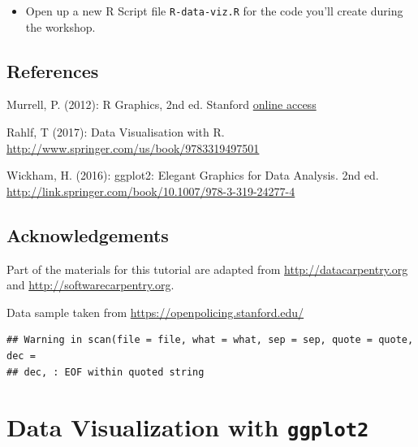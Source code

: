 \documentclass[]{book}
\providecommand{\tightlist}{%
  \setlength{\itemsep}{0pt}\setlength{\parskip}{0pt}}
\theoremstyle{definition}
\theoremstyle{definition}
\theoremstyle{definition}
\theoremstyle{remark}
\begin{document}
\begin{itemize}
\tightlist
\item
  Open up a new R Script file \texttt{R-data-viz.R} for the code you'll
  create during the workshop.
\end{itemize}

\section*{References}\label{references}

Murrell, P. (2012): R Graphics, 2nd ed. Stanford
\href{https://stanford.idm.oclc.org/login?url=http://proquest.safaribooksonline.com/?uiCode=stanford\&xmlId=9781439831779}{online
access}

Rahlf, T (2017): Data Visualisation with R.
\url{http://www.springer.com/us/book/9783319497501}

Wickham, H. (2016): ggplot2: Elegant Graphics for Data Analysis. 2nd ed.
\url{http://link.springer.com/book/10.1007/978-3-319-24277-4}

\section*{Acknowledgements}\label{acknowledgements}

Part of the materials for this tutorial are adapted from
\url{http://datacarpentry.org} and \url{http://softwarecarpentry.org}.

Data sample taken from \url{https://openpolicing.stanford.edu/}

\begin{verbatim}
## Warning in scan(file = file, what = what, sep = sep, quote = quote, dec =
## dec, : EOF within quoted string
\end{verbatim}

\chapter{\texorpdfstring{Data Visualization with
\texttt{ggplot2}}{Data Visualization with ggplot2}}\label{data-visualization-with-ggplot2}
\end{document}

